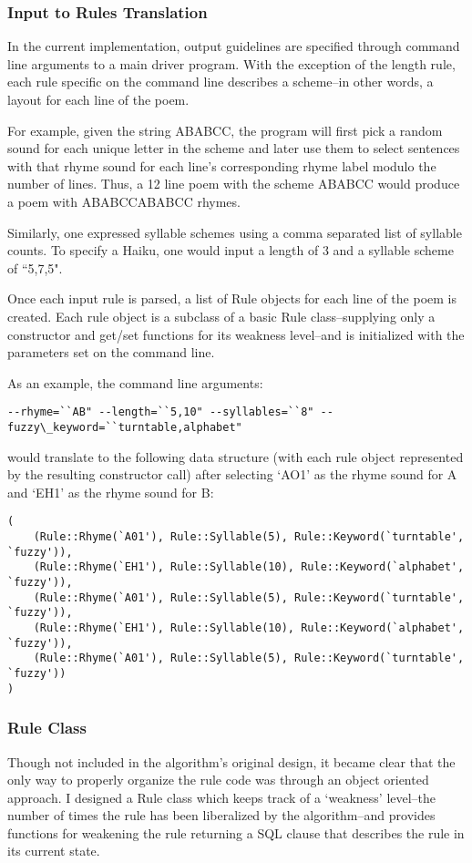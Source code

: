 \documentclass[10pt]{article}
\begin{document}
\subsubsection{Input to Rules Translation}
In the current implementation, output guidelines are specified through command
line arguments to a main driver program. With the exception of the length rule,
each rule specific on the command line describes a scheme--in other words, a
layout for each line of the poem.

For example, given the string ABABCC, the program will first pick a random
sound for each unique letter in the scheme and later use them to select
sentences with that rhyme sound for each line's corresponding rhyme label
modulo the number of lines. Thus, a 12 line poem with the scheme ABABCC would
produce a poem with ABABCCABABCC rhymes.

Similarly, one expressed syllable schemes using a comma separated list of
syllable counts. To specify a Haiku, one would input a length of 3 and a
syllable scheme of ``5,7,5".

Once each input rule is parsed, a list of Rule objects for each line of the
poem is created. Each rule object is a subclass of a basic Rule
class--supplying only a constructor and get/set functions for its weakness
level--and is initialized with the parameters set on the command line.

As an example, the command line arguments:
\begin{verbatim}
--rhyme=``AB" --length=``5,10" --syllables=``8" --fuzzy\_keyword=``turntable,alphabet"
\end{verbatim}
would translate to the following data structure (with each rule object
represented by the resulting constructor call) after selecting `AO1' as the
rhyme sound for A and `EH1' as the rhyme sound for B:

\begin{verbatim}
(
    (Rule::Rhyme(`A01'), Rule::Syllable(5), Rule::Keyword(`turntable', `fuzzy')),
    (Rule::Rhyme(`EH1'), Rule::Syllable(10), Rule::Keyword(`alphabet', `fuzzy')),
    (Rule::Rhyme(`A01'), Rule::Syllable(5), Rule::Keyword(`turntable', `fuzzy')),
    (Rule::Rhyme(`EH1'), Rule::Syllable(10), Rule::Keyword(`alphabet', `fuzzy')),
    (Rule::Rhyme(`A01'), Rule::Syllable(5), Rule::Keyword(`turntable', `fuzzy'))
)
\end{verbatim}

\subsubsection{Rule Class}
Though not included in the algorithm's original design, it became clear that
the only way to properly organize the rule code was through an object oriented
approach. I designed a Rule class which keeps track of a `weakness' level--the
number of times the rule has been liberalized by the algorithm--and provides
functions for weakening the rule returning a SQL clause that describes the rule
in its current state.
\end{document}
